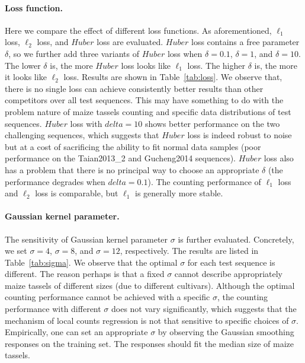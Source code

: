 \documentclass[twocolumn]{bmcart}%
\begin{document}
\paragraph{Loss function.} Here we compare the effect of different loss functions. As aforementioned, $\ell_1$ loss, $\ell_2$ loss, and $Huber$ loss are evaluated. $Huber$ loss contains a free parameter $\delta$, so we further add three variants of $Huber$ loss when $\delta=0.1$, $\delta=1$, and $\delta=10$. The lower $\delta$ is, the more $Huber$ loss looks like $\ell_1$ loss. The higher $\delta$ is, the more it looks like $\ell_2$ loss. Results are shown in Table~\ref{tab:loss}. We observe that, there is no single loss can achieve consistently better results than other competitors over all test sequences. This may have something to do with the problem nature of maize tassels counting and specific data distributions of test sequences. $Huber$ loss with $delta=10$ shows better performance on the two challenging sequences, which suggests that $Huber$ loss is indeed robust to noise but at a cost of sacrificing the ability to fit normal data samples (poor performance on the Taian2013\_2 and Gucheng2014 sequences). $Huber$ loss also has a problem that there is no principal way to choose an appropriate $\delta$ (the performance degrades when $delta=0.1$). The counting performance of $\ell_1$ loss and $\ell_2$ loss is comparable, but $\ell_1$ is generally more stable.

\paragraph{Gaussian kernel parameter.} The sensitivity of Gaussian kernel parameter $\sigma$ is further evaluated. Concretely, we set $\sigma=4$, $\sigma=8$, and $\sigma=12$, respectively. The results are listed in Table~\ref{tab:sigma}. We observe that the optimal $\sigma$ for each test sequence is different. The reason perhaps is that a fixed $\sigma$ cannot describe appropriately maize tassels of different sizes (due to different cultivars). Although the optimal counting performance cannot be achieved with a specific $\sigma$, the counting performance with different $\sigma$ does not vary significantly, which suggests that the mechanism of local counts regression is not that sensitive to specific choices of $\sigma$. Empirically, one can set an appropriate $\sigma$ by observing the Gaussian smoothing responses on the training set. The responses should fit the median size of maize tassels.
\end{document}
